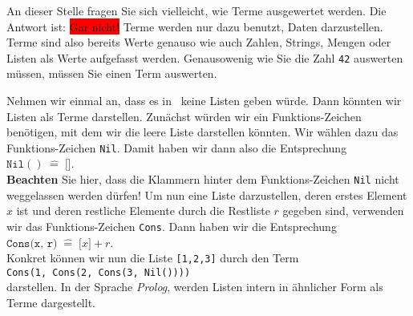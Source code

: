 An dieser Stelle fragen Sie sich vielleicht, wie Terme ausgewertet werden.  Die Antwort ist:
\colorbox{red}{Gar nicht!}  Terme werden nur dazu benutzt, Daten darzustellen.  Terme sind also bereits 
Werte  genauso wie auch Zahlen, Strings, Mengen oder Listen als Werte aufgefasst werden.
Genausowenig wie Sie die Zahl \texttt{42} auswerten m\"{u}ssen, m\"{u}ssen Sie einen Term auswerten.

Nehmen wir einmal an,
dass es in \setl\ keine Listen geben w\"{u}rde.  Dann k\"{o}nnten wir Listen als Terme darstellen.  Zun\"{a}chst
w\"{u}rden wir ein Funktions-Zeichen ben\"{o}tigen, mit dem wir die leere Liste darstellen k\"{o}nnten.  Wir
w\"{a}hlen dazu das Funktions-Zeichen \texttt{Nil}.  Damit haben wir dann also die Entsprechung
\\[0.2cm]
\hspace*{1.3cm}
$\texttt{Nil}() \;\widehat{=}\; \texttt{[]}$.
\\[0.2cm]
\textbf{Beachten} Sie hier, dass die Klammern hinter dem Funktions-Zeichen \texttt{Nil} nicht
weggelassen werden d\"{u}rfen!  Um nun eine Liste darzustellen, deren erstes Element $x$ ist und deren
restliche Elemente durch die Restliste $r$ gegeben sind, verwenden wir das Funktions-Zeichen
\texttt{Cons}.  Dann haben wir die Entsprechung
\\[0.2cm]
\hspace*{1.3cm}
$\texttt{Cons(x, r)} \;\widehat{=}\; \texttt{[}x\texttt{]}+r$. 
\\[0.2cm]
Konkret k\"{o}nnen wir nun die Liste \texttt{[1,2,3]} durch den Term
\\[0.2cm]
\hspace*{1.3cm}
\texttt{Cons(1, Cons(2, Cons(3, Nil())))}
\\[0.2cm]
darstellen.  In der Sprache \textsl{Prolog}, werden Listen intern in \"{a}hnlicher Form als Terme dargestellt.

